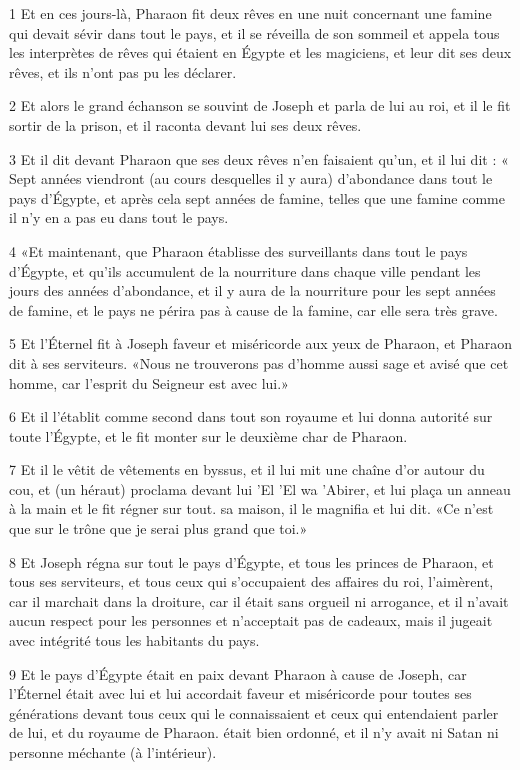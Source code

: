 \par 1 Et en ces jours-là, Pharaon fit deux rêves en une nuit concernant une famine qui devait sévir dans tout le pays, et il se réveilla de son sommeil et appela tous les interprètes de rêves qui étaient en Égypte et les magiciens, et leur dit ses deux rêves, et ils n'ont pas pu les déclarer.
\par 2 Et alors le grand échanson se souvint de Joseph et parla de lui au roi, et il le fit sortir de la prison, et il raconta devant lui ses deux rêves.
\par 3 Et il dit devant Pharaon que ses deux rêves n'en faisaient qu'un, et il lui dit : « Sept années viendront (au cours desquelles il y aura) d'abondance dans tout le pays d'Égypte, et après cela sept années de famine, telles que une famine comme il n'y en a pas eu dans tout le pays.
\par 4 «Et maintenant, que Pharaon établisse des surveillants dans tout le pays d'Égypte, et qu'ils accumulent de la nourriture dans chaque ville pendant les jours des années d'abondance, et il y aura de la nourriture pour les sept années de famine, et le pays ne périra pas à cause de la famine, car elle sera très grave.
\par 5 Et l'Éternel fit à Joseph faveur et miséricorde aux yeux de Pharaon, et Pharaon dit à ses serviteurs. «Nous ne trouverons pas d'homme aussi sage et avisé que cet homme, car l'esprit du Seigneur est avec lui.»
\par 6 Et il l'établit comme second dans tout son royaume et lui donna autorité sur toute l'Égypte, et le fit monter sur le deuxième char de Pharaon.
\par 7 Et il le vêtit de vêtements en byssus, et il lui mit une chaîne d'or autour du cou, et (un héraut) proclama devant lui 'El 'El wa 'Abirer, et lui plaça un anneau à la main et le fit régner sur tout. sa maison, il le magnifia et lui dit. «Ce n'est que sur le trône que je serai plus grand que toi.»
\par 8 Et Joseph régna sur tout le pays d'Égypte, et tous les princes de Pharaon, et tous ses serviteurs, et tous ceux qui s'occupaient des affaires du roi, l'aimèrent, car il marchait dans la droiture, car il était sans orgueil ni arrogance, et il n'avait aucun respect pour les personnes et n'acceptait pas de cadeaux, mais il jugeait avec intégrité tous les habitants du pays.
\par 9 Et le pays d'Égypte était en paix devant Pharaon à cause de Joseph, car l'Éternel était avec lui et lui accordait faveur et miséricorde pour toutes ses générations devant tous ceux qui le connaissaient et ceux qui entendaient parler de lui, et du royaume de Pharaon. était bien ordonné, et il n'y avait ni Satan ni personne méchante (à l'intérieur).
